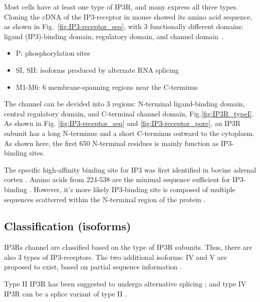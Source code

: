 Most cells have at least one type of IP3R, and many express all three
types.  Cloning the cDNA of the IP3-receptor in mouse showed its amino
acid sequence, as shown in Fig.~\ref{fig:IP3-receptor_seq}, with 3
functionally different domains: ligand (IP3)-binding domain,
regulatory domain, and channel domain~\citep{mikoshiba1993itr}.


\begin{itemize}
\item P: phosphorylation sites

\item SI, SII: isoforms produced by alternate RNA splicing

\item M1-M6: 6 membrane-spanning regions near the C-terminus
\end{itemize}
The channel can be devided into 3 regions: N-terminal ligand-binding domain,
central regulatory domain, and C-terminal channel domain,
Fig.\ref{fig:IP3R_typeI}. As shown in Fig. \ref{fig:IP3-receptor_seq} and
\ref{fig:IP3-receptor_pore}, an IP3R subunit has a long N-terminus and
a short C-terminus outward to the cytoplasm.  As shown here, the first
650 N-terminal residues is mainly function as IP3-binding sites. 

The specific high-affinity binding site for IP3 was first identified in bovine
adrenal cortex \citep{baukal1985}. Amino acids from 224-538 are the minimal
sequence sufficient for IP3-binding \citep{yoshikawa1996}. However, it's more
likely IP3-binding site is composed of multiple sequences scatterred within the
N-terminal region of the protein \citep{patel1999}.




\subsection{Classification (isoforms)}
\label{sec:classification}
\label{sec:types_IP3R}

IP3Rs channel are classified based on the type of IP3R subunits. Thus,
there are also 3 types of IP3-receptors. 
The two additional isoforms: IV and V are proposed to exist, based on partial
sequence information \citep{ross1992,de_smedt1994}.

Type II IP3R has been suggested to undergo
alternative splicing \citep{sudhof1991}; and type IV IP3R can be a splice
variant of type II \citep{ross1992, parys1995}.

